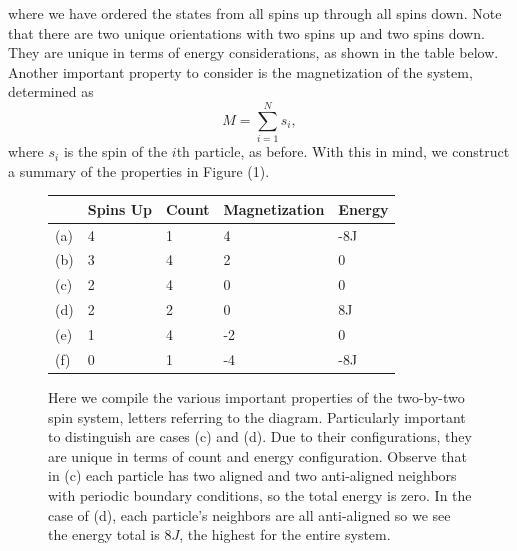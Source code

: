 \documentclass[11pt,a4paper]{article}
\begin{document}
where we have ordered the states from all spins up through all spins down. Note that there are two unique orientations with two spins up and two spins down. They are unique in terms of energy considerations, as shown in the table below. Another important property to consider is the magnetization of the system, determined as
\begin{equation}
M = \sum\limits^N_{i=1} s_i,
\end{equation}
where $s_i$ is the spin of the $i$th particle, as before. With this in mind, we construct a summary of the properties in Figure (1).
\begin{figure}
\centering
\begin{tabular}{| l | l | l | l | l |}
\hline
 & Spins Up & Count & Magnetization & Energy  \\ \hline
(a) & 4 & 1 & 4 & -8J \\ \hline
(b) & 3 & 4 & 2 & 0 \\ \hline
(c) & 2 & 4 & 0 & 0 \\ \hline
(d) & 2 & 2 & 0 & 8J \\ \hline
(e) & 1 & 4 & -2 & 0 \\ \hline
(f) & 0 & 1 & -4 & -8J \\ \hline
\end{tabular}
\caption{Here we compile the various important properties of the two-by-two spin system, letters referring to the diagram. Particularly important to distinguish are cases (c) and (d). Due to their configurations, they are unique in terms of count and energy configuration. Observe that in (c) each particle has two aligned and two anti-aligned neighbors with periodic boundary conditions, so the total energy is zero. In the case of (d), each particle's neighbors are all anti-aligned so we see the energy total is $8J$, the highest for the entire system.}
\end{figure}
\end{document}
